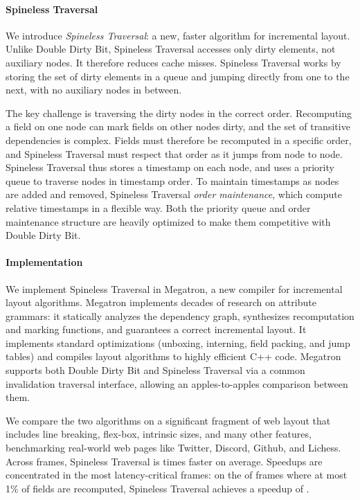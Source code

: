 \paragraph{Spineless Traversal}

We introduce \textit{Spineless Traversal}:
  a new, faster algorithm for incremental layout.
Unlike Double Dirty Bit,
  Spineless Traversal accesses only dirty elements,
  not auxiliary nodes.
It therefore reduces cache misses.
Spineless Traversal works by
  storing the set of dirty elements in a queue
  and jumping directly from one to the next,
  with no auxiliary nodes in between.

The key challenge is traversing the dirty nodes in the correct order. 
Recomputing a field on one node
  can mark fields on other nodes dirty,
  and the set of transitive dependencies is complex.
Fields must therefore be recomputed in a specific order,
  and Spineless Traversal must respect that order
  as it jumps from node to node.
Spineless Traversal thus stores
  a timestamp on each node,
  and uses a priority queue to traverse nodes
  in timestamp order.
To maintain timestamps as nodes are added and removed,
  Spineless Traversal \emph{order maintenance},
  which compute relative timestamps in a flexible way.
Both the priority queue and order maintenance structure
  are heavily optimized to make them competitive with Double Dirty Bit.

\paragraph{Implementation}

We implement Spineless Traversal in Megatron,
  a new compiler for incremental layout algorithms.
Megatron implements decades of research on attribute grammars:
  it statically analyzes the dependency graph,
  synthesizes recomputation and marking functions,
  and guarantees a correct incremental layout.
It implements standard optimizations
  (unboxing, interning, field packing, and jump tables)
  and compiles layout algorithms to highly efficient C++ code.
Megatron supports both Double Dirty Bit and Spineless Traversal
  via a common invalidation traversal interface,
  allowing an apples-to-apples comparison between them.

We compare the two algorithms on
  a significant fragment of web layout that includes
  line breaking, flex-box, intrinsic sizes, and many other features,
  benchmarking \TotalTraceCount real-world web pages
  like Twitter, Discord, Github, and Lichess.
Across \TotalDiffCount frames,
  Spineless Traversal is \DBPQtotal times faster on average.
Speedups are concentrated in the most latency-critical frames:
  on the \PctSmall of frames
  where at most 1\% of fields are recomputed,
  Spineless Traversal achieves a speedup
  of \MeanSpeedupSmall.
